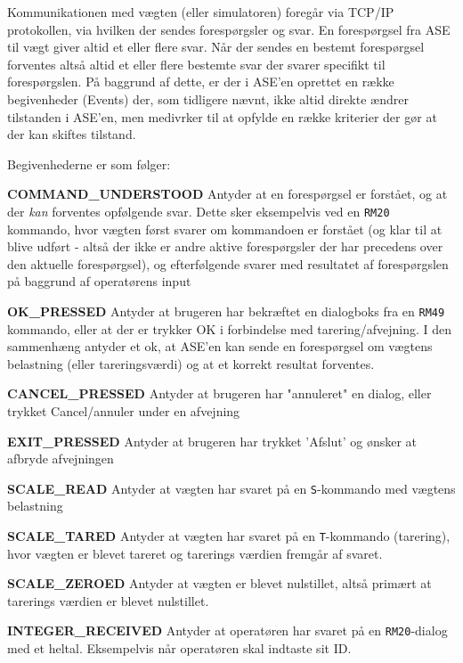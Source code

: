 \documentclass[a4paper]{article}
\newenvironment{my_itemize}
{\begin{itemize}
  \setlength{\itemsep}{1pt}
  \setlength{\parskip}{0pt}
  \setlength{\parsep}{0pt}}
{\end{itemize}}
\begin{document}
Kommunikationen med vægten (eller simulatoren) foregår via TCP/IP protokollen, via hvilken der sendes forespørgsler og svar. En forespørgsel fra ASE til vægt giver altid et eller flere svar. Når der sendes en bestemt forespørgsel forventes altså altid et eller flere bestemte svar der svarer specifikt til forespørgslen. På baggrund af dette, er der i ASE'en oprettet en række begivenheder (Events) der, som tidligere nævnt, ikke altid direkte ændrer tilstanden i ASE'en, men medivrker til at opfylde en række kriterier der gør at der kan skiftes tilstand.

Begivenhederne er som følger:

\begin{my_itemize}
  \item \textbf{COMMAND\_UNDERSTOOD} Antyder at en forespørgsel er forstået, og at der \emph{kan} forventes opfølgende svar. Dette sker eksempelvis ved en \texttt{RM20} kommando, hvor vægten først svarer om kommandoen er forstået (og klar til at blive udført - altså der ikke er andre aktive forespørgsler der har precedens over den aktuelle forespørgsel), og efterfølgende svarer med resultatet af forespørgslen på baggrund af operatørens input
  \item \textbf{OK\_PRESSED} Antyder at brugeren har bekræftet en dialogboks fra en \texttt{RM49} kommando, eller at der er trykker OK i forbindelse med tarering/afvejning. I den sammenhæng antyder et ok, at ASE'en kan sende en forespørgsel om vægtens belastning (eller tareringsværdi) og at et korrekt resultat forventes.
  \item \textbf{CANCEL\_PRESSED} Antyder at brugeren har "annuleret" en dialog, eller trykket Cancel/annuler under en afvejning
  \item \textbf{EXIT\_PRESSED} Antyder at brugeren har trykket 'Afslut' og ønsker at afbryde afvejningen
  \item \textbf{SCALE\_READ} Antyder at vægten har svaret på en \texttt{S}-kommando med vægtens belastning
  \item \textbf{SCALE\_TARED} Antyder at vægten har svaret på en \texttt{T}-kommando (tarering), hvor vægten er blevet tareret og tarerings værdien fremgår af svaret.
  \item \textbf{SCALE\_ZEROED} Antyder at vægten er blevet nulstillet, altså primært at tarerings værdien er blevet nulstillet.
  \item \textbf{INTEGER\_RECEIVED} Antyder at operatøren har svaret på en \texttt{RM20}-dialog med et heltal. Eksempelvis når operatøren skal indtaste sit ID.
\end{my_itemize}
\end{document}

